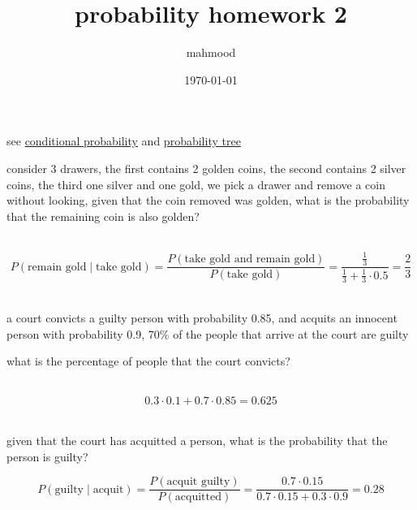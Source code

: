 \documentclass[a4paper,12pt]{article}
\author{mahmood}
\date{\today}
\title{probability homework 2}
\begin{document}
\maketitle
see \href{20230127023141-dependence.org}{conditional probability} and \href{20230126225225-probability_tree.org}{probability tree}\\

\begin{question}
consider 3 drawers, the first contains 2 golden coins, the second contains 2 silver coins, the third one silver and one gold, we pick a drawer and remove a coin without looking, given that the coin removed was golden, what is the probability that the remaining coin is also golden?\\
\begin{answer}
\\

\[
P(\text{remain gold} \mid \text{take gold}) = \frac{P(\text{take gold and remain gold})}{P(\text{take gold})} = \frac{\frac{1}{3}}{\frac{1}{3} + \frac{1}{3} \cdot 0.5} = \frac{2}{3}
\]\\
\end{answer}
\end{question}

\begin{question}
a court convicts a guilty person with probability 0.85, and acquits an innocent person with probability 0.9, 70\% of the people that arrive at the court are guilty\\
\begin{subquestion}
what is the percentage of people that the court convicts?\\
\begin{answer}
\\

\[
0.3 \cdot 0.1 + 0.7 \cdot 0.85 = 0.625
\]\\
\end{answer}
\end{subquestion}
\begin{subquestion}
given that the court has acquitted a person, what is the probability that the person is guilty?\\
\begin{answer}
\[
P(\text{guilty} \mid \text{acquit}) = \frac{P(\text{acquit guilty})}{P(\text{acquitted})} = \frac{0.7 \cdot 0.15}{0.7 \cdot 0.15 + 0.3 \cdot 0.9} = 0.28
\]\\
\end{answer}
\end{subquestion}
\end{question}
\end{document}
